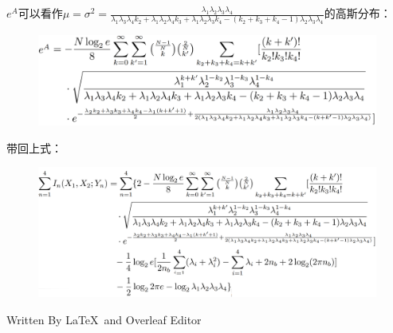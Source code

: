 \documentclass[12pt]{article}
\begin{document}
$e^A$可以看作$\mu=\sigma^2=\frac{\lambda_1\lambda_2\lambda_3\lambda_4}{\lambda_1\lambda_3\lambda_4k_2+\lambda_1\lambda_2\lambda_4k_3+\lambda_1\lambda_2\lambda_3k_4-(k_2+k_3+k_4-1)\lambda_2\lambda_3\lambda_4}$的高斯分布：\par
\begin{figure}[htpb]
    \centering
    \includegraphics[width=15.4cm]{11.png}
\end{figure}
带回上式：\par
\begin{figure}[htpb]
    \centering
    \includegraphics[width=16.5cm]{12.png}
\end{figure}

\vfill
\centering\large{Written By \LaTeX\ and Overleaf Editor}
\end{document}
